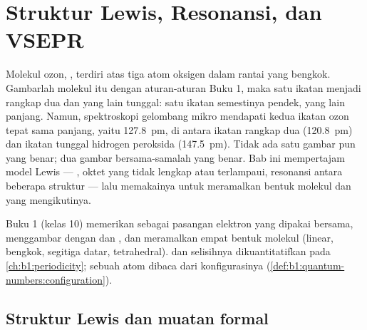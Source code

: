 \chapter{Struktur Lewis, Resonansi, dan VSEPR}\label{ch:b1:lewis-resonance-vsepr}

Molekul ozon, , terdiri atas tiga atom oksigen dalam rantai yang
bengkok. Gambarlah molekul itu dengan aturan-aturan Buku 1, maka satu
ikatan menjadi rangkap dua dan yang lain tunggal: satu ikatan semestinya
pendek, yang lain panjang. Namun, spektroskopi gelombang mikro mendapati
kedua ikatan  ozon tepat sama panjang, yaitu \qty{127.8}{pm}, di
antara ikatan rangkap dua  (\qty{120.8}{pm}) dan ikatan tunggal
hidrogen peroksida (\qty{147.5}{pm}). Tidak ada satu gambar pun yang
benar; dua gambar bersama-samalah yang benar. Bab ini mempertajam model
Lewis --- , oktet yang tidak lengkap atau terlampaui,
resonansi antara beberapa struktur --- lalu memakainya untuk meramalkan
bentuk molekul dan  yang mengikutinya.

\begin{recall}
Buku 1 (kelas 10) memerikan  sebagai pasangan elektron yang
dipakai bersama, menggambar  dengan  dan , dan meramalkan empat bentuk molekul
(linear, bengkok, segitiga datar, tetrahedral).  dan
selisihnya dikuantitatifkan pada \cref{ch:b1:periodicity};  sebuah atom dibaca dari konfigurasinya
(\cref{def:b1:quantum-numbers:configuration}).
\end{recall}

\section{Struktur Lewis dan muatan formal}

